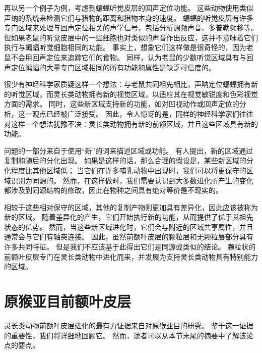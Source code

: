 再以另一个例子为例，考虑到蝙蝠听觉皮层的回声定位功能。
这些动物使用类似声纳的系统来检测它们与猎物的距离和猎物本身的速度。
蝙蝠的听觉皮层有许多专门区域来处理与回声定位相关的声学信号，包括分析调频声音、多普勒频移等\cite{suga1997cortical,fitzpatrick1998distribution}。
但如果老鼠的听觉皮层中的一些细胞也对类似的声音作出反应，这并不意味着它们执行与蝙蝠听觉细胞相同的功能。
事实上，想象它们这样做是很奇怪的，因为老鼠不会用回声定位来追踪它们的食物。
同样，认为老鼠的少数听觉区域具有与回声定位蝙蝠的大量专门区域相同的所有功能和属性是缺乏可信度的。


很少有神经科学家质疑这样一个想法：与老鼠共同祖先相比，声呐定位蝙蝠拥有新的听觉区域，而灵长类动物拥有新的视觉区域，以适应其在视觉敏锐度和色彩视觉方面的需求。
同时，这些新区域支持新的功能，如对凹视动作或回声定位的分析，这一观点已经被广泛接受。
因此，令人惊讶的是，同样的神经科学家们往往对这样一个想法犹豫不决：灵长类动物拥有新的前额区域，并且这些区域具有新的功能。


问题的一部分来自于使用“新”的词来描述区域或功能。
有人提出，新的区域通过复制和随后的分化出现\cite{krubitzer2000arealization}。
如果是这样的话，那么合理的假设是，某些新区域的分化程度比其他区域低；
当它们在许多哺乳动物中出现时，我们可以将更保守的区域识别为同源的。
然而，在这样做时，我们需要认识到大多数进化所产生的变化都涉及到同源结构的修改，因此在物种之间具有绝对等价是不现实的。


相较于这些相对保守的区域，其他的复制产物则更加具有差异化，因此应该被称为新的区域。
随着差异化的产生，它们开始执行新的功能，从而提供了优于其祖先状态的优势。
然而，当这些新区域进化时，它们会与附近的区域共享属性，并且通常会与它们有轴突连接。
因此，虽然前额叶皮层的颗粒层和无颗粒层部分具有许多共同特征。
但是我们不应该基于此得出它们是同源或类似的结论。
颗粒状的前额叶皮层专门在灵长类动物中进化而来，并发展为支持灵长类动物具有特别能力的区域。


\section{原猴亚目前额叶皮层}
灵长类动物前额叶皮层进化的最有力证据来自对原猴亚目的研究。
鉴于这一证据的重要性，我们将详细地回顾它。
然而，读者可以从本节末尾的摘要中了解该论点的要点。

